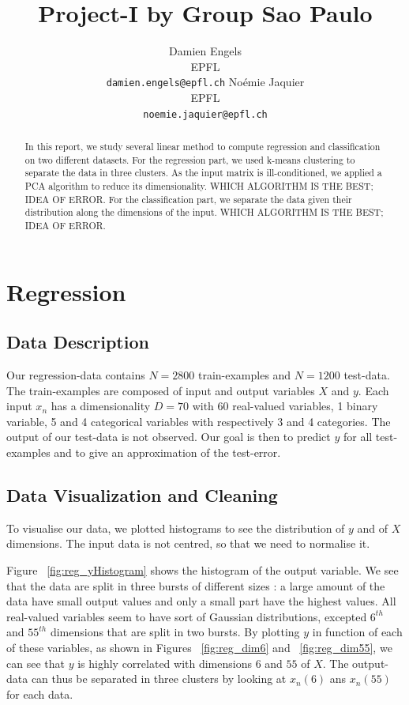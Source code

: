 \documentclass{article} %
\title{Project-I by Group Sao Paulo}
\author{
Damien Engels\\
EPFL \\
\texttt{damien.engels@epfl.ch} \And No\'emie Jaquier\\
EPFL \\
\texttt{noemie.jaquier@epfl.ch} \\
}
\begin{document}
\maketitle

\begin{abstract}
In this report, we study several linear method to compute regression and classification on two different datasets. For the regression part, we used k-means clustering to separate the data in three clusters. As the input matrix is ill-conditioned, we applied a PCA algorithm to reduce its dimensionality. WHICH ALGORITHM IS THE BEST; IDEA OF ERROR. For the classification part, we separate the data given their distribution along the dimensions of the input. WHICH ALGORITHM IS THE BEST; IDEA OF ERROR.
\end{abstract}

\section{Regression}
\subsection{Data Description}
Our regression-data contains $N=2800$ train-examples and $N=1200$ test-data. The
train-examples are composed of input and output variables $X$ and $y$. Each
input $x_n$ has a dimensionality $D=70$ with 60 real-valued variables, 1 binary
variable, 5 and 4 categorical variables with respectively 3 and 4 categories.
The output of our test-data is not observed. Our goal is then to predict $y$ for
all test-examples and to give an approximation of the test-error.

\subsection{Data Visualization and Cleaning}
To visualise our data, we plotted histograms to see the distribution of $y$ and
of $X$ dimensions. The input data is not centred, so that we need to normalise
it. 

Figure ~\ref{fig:reg_yHistogram} shows the histogram of the output variable. We
see that the data are split in three bursts of different sizes : a large amount
of the data have small output values and only a small part have the highest
values. All real-valued variables seem to have sort of Gaussian distributions,
excepted $6^{th}$ and $55^{th}$ dimensions that are split in two bursts. By
plotting $y$ in function of each of these variables, as shown in Figures
~\ref{fig:reg_dim6} and ~\ref{fig:reg_dim55}, we can see that $y$ is highly
correlated with dimensions $6$ and $55$ of $X$. The output-data can thus be
separated in three clusters by looking at $x_n(6)$ ans $x_n(55)$ for each data.
\end{document}
